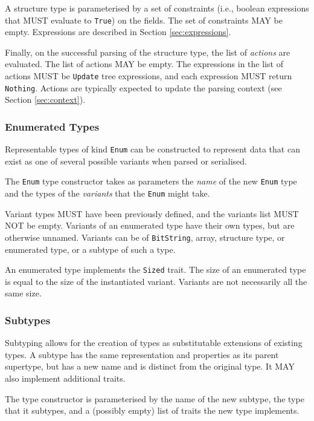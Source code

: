 \documentclass[10pt,twocolumn,a4paper]{article}
\newcommand{\code}[1]{\texttt{#1}}
\begin{document}
A structure type is parameterised by a set of constraints (i.e., boolean
expressions that MUST evaluate to \code{True}) on the
fields. The set of constraints MAY be empty. Expressions are described in
Section \ref{sec:expressions}.

Finally, on the successful parsing of the structure type, the list of
\emph{actions} are evaluated. The list of actions MAY be empty. The
expressions in the list of actions MUST be \code{Update} tree expressions,
and each expression MUST return \code{Nothing}. Actions are typically
expected to update the parsing context (see Section \ref{sec:context}).

\subsubsection{Enumerated Types}

Representable types of kind \code{Enum} can be constructed to represent
data that can exist as one of several possible variants when parsed or
serialised.

The \code{Enum} type constructor takes as parameters the \emph{name} of the
new \code{Enum} type and the types of the \emph{variants} that the
\code{Enum} might take.

Variant types MUST have been
previously defined, and the variants list MUST NOT be empty. Variants of
an enumerated type have their own types, but are otherwise unnamed.
Variants can be of \code{BitString}, array, structure type, or enumerated type, or
a subtype of such a type.

An enumerated type implements the \code{Sized} trait. The size of an enumerated type
is equal to the size of the instantiated variant. Variants are not
necessarily all the same size.

\subsubsection{Subtypes}

Subtyping allows for the creation of types as substitutable extensions of
existing types. A subtype has the same representation
and properties as its parent supertype, but has a new name and is
distinct from the original type. It MAY also implement additional traits.

The type constructor is parameterised by the name of the new subtype,
the type that it subtypes, and a (possibly empty) list of traits the new
type implements.
\end{document}
